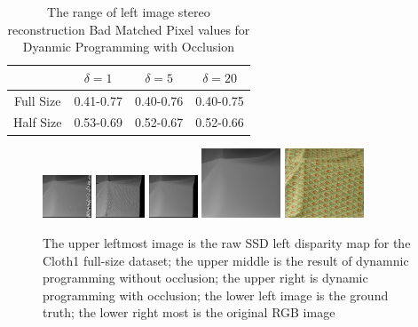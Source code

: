 \documentclass[11pt,a4paper]{article}
\begin{document}
 \begin{table}
    \centering
    \begin{tabular}{ |c|c|c|c| } 
     \hline
      & $\delta = 1$ & $\delta = 5$ & $\delta = 20$ \\
     \hline
     Full Size & 0.41-0.77 & 0.40-0.76 & 0.40-0.75\\ 
     \hline
     Half Size & 0.53-0.69 & 0.52-0.67 & 0.52-0.66\\ 
     \hline
    \end{tabular}
    \caption{The range of left image stereo reconstruction Bad Matched Pixel values for Dyanmic Programming with Occlusion}
    \label{tab:table1}
\end{table}

\begin{figure}
    \centering
    \includegraphics[width=0.13\textwidth]{figures/ssd_res5.png}
    \includegraphics[width=0.13\textwidth]{figures/nofill_res5.png}
    \includegraphics[width=0.13\textwidth]{figures/res5.png}
    \includegraphics[width=0.21\textwidth]{figures/disp5.png}
    \includegraphics[width=0.21\textwidth]{figures/view5.png}
    \caption{The upper leftmost image is the raw SSD left disparity map for the Cloth1 full-size dataset; the upper middle is the result of dynamnic programming without occlusion; 
    the upper right is dynamic programming with occlusion; the lower left image is the ground truth; the lower right most is the original RGB image}
    \label{fig:images}
\end{figure}
\end{document}
